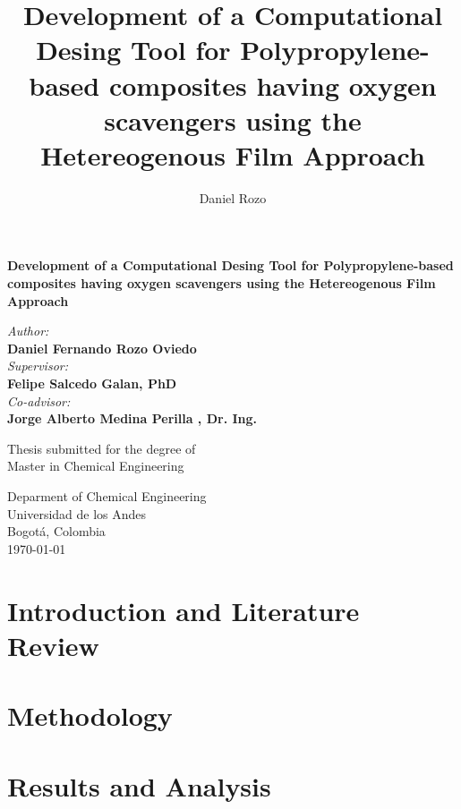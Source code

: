 \documentclass[twoside,11pt]{report}
\title{Development of a Computational Desing Tool for Polypropylene-based composites having oxygen scavengers using the Hetereogenous Film Approach}
\author{Daniel Rozo}
\date{\Today}
\begin{document}
\begin{titlepage}
\begin{center}
\BgThispage
        \huge
        \textbf{Development of a Computational Desing Tool for Polypropylene-based composites having oxygen scavengers using the Hetereogenous Film Approach}
        
        \vspace{1cm}
        \LARGE

        \vspace{4cm}
        \textit{Author:}\\
        \textbf{Daniel Fernando Rozo Oviedo}\\
        \vspace{1.5cm}
        \textit{Supervisor:}\\
        \textbf{Felipe Salcedo Galan, PhD}\\
        \textit{Co-advisor:}\\
        \textbf{Jorge Alberto Medina Perilla , Dr. Ing.}
        \vfill
 
        Thesis submitted for the degree of\\ Master in Chemical Engineering
        
 
        \vspace{1cm}
 
        
 
        \Large
        Deparment of Chemical Engineering\\
        Universidad de los Andes\\
        Bogotá, Colombia\\
        \today
 
    \end{center}
\afterpage{\null\newpage}
\end{titlepage}


\tableofcontents
\vspace{\fill}
\pagestyle{fancy}
\chapter{Introduction and Literature Review}

\pagebreak
\chapter{Methodology}

\chapter{Results and Analysis}

\end{document}
